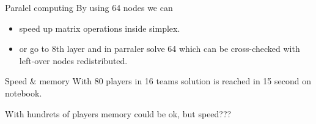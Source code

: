 \documentclass[11pt]{beamer}
\begin{document}
\begin{frame}{Paralel computing}
By using 64 nodes we can
\begin{itemize}
\item speed up matrix operations inside simplex.
\item or go to 8th layer and in parraler solve 64  which can be cross-checked with left-over nodes redistributed.
\end{itemize}
\end{frame}

\begin{frame}{Speed $\&$ memory}
With 80 players in 16 teams  solution is reached in 15 second on notebook.\\\vspace{0.5cm}

With hundrets of players memory could be ok, but speed???
\end{frame}
\end{document}
